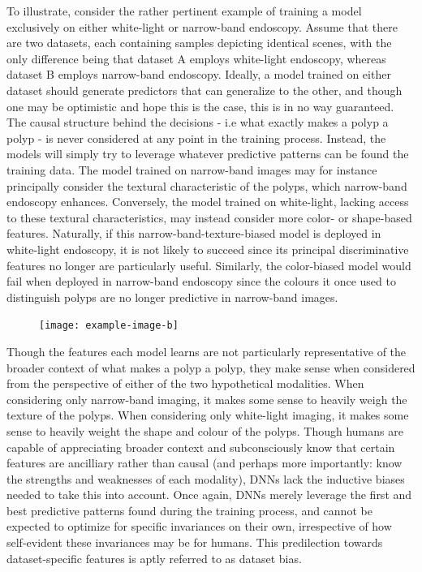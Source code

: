 		To illustrate, consider the rather pertinent example of training a model exclusively on either white-light or narrow-band endoscopy. Assume that there are two datasets, each containing samples depicting identical scenes, with the only difference being that dataset A employs white-light endoscopy, whereas dataset B employs narrow-band endoscopy. Ideally, a model trained on either dataset should generate predictors that can generalize to the other, and though one may be optimistic and hope this is the case, this is in no way guaranteed. The causal structure behind the decisions - i.e what exactly makes a polyp a polyp - is never considered at any point in the training process. Instead, the models will simply try to leverage whatever predictive patterns can be found the training data. The model trained on narrow-band images may for instance principally consider the textural characteristic of the polyps, which narrow-band endoscopy enhances. Conversely, the model trained on white-light, lacking access to these textural characteristics, may instead consider more color- or shape-based features. Naturally, if this narrow-band-texture-biased model is deployed in white-light endoscopy, it is not likely to succeed since its principal discriminative features no longer are particularly useful. Similarly, the color-biased model would fail when deployed in narrow-band endoscopy since the colours it once used to distinguish polyps are no longer predictive in narrow-band images.  

		\begin{figure}[h]
			\texttt{[image: example-image-b]}
			\caption{}
			\label{imaging_modalities}
		\end{figure}

		Though the features each model learns are not particularly representative of the broader context of what makes a polyp a polyp, they make sense when considered from the perspective of either of the two hypothetical modalities. When considering only narrow-band imaging, it makes some sense to heavily weigh the texture of the polyps. When considering only white-light imaging, it makes some sense to heavily weight the shape and colour of the polyps. Though humans are capable of appreciating broader context and subconsciously know that certain features are ancilliary rather than causal (and perhaps more importantly: know the strengths and weaknesses of each modality), DNNs lack the inductive biases needed to take this into account. Once again, DNNs merely leverage the first and best predictive patterns found during the training process, and cannot be expected to optimize for specific invariances on their own, irrespective of how self-evident these invariances may be for humans. This predilection towards dataset-specific features is aptly referred to as dataset bias. 
		
